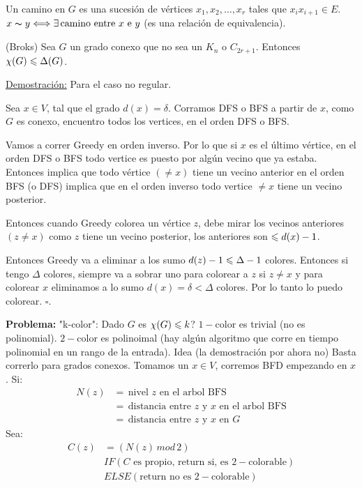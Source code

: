\documentclass[12pt,a4paper]{article}
\begin{document}
\begin{definition} Un camino en $G$ es una sucesión de vértices $x_{1},x_{2},\ldots,x_{r}$
    tales que $x_{i}x_{i+1} \in E$. $x \thicksim y \Longleftrightarrow \exists \,\text{camino entre $x$ e $y$}$
    (es una relación de equivalencia).
\end{definition}

\begin{teorema} (Broks) Sea $G$ un grado conexo que no sea un $K_{n}$ o $C_{2r+1}$. 
    Entonces $\chi(G) \leqslant \Delta(G)$.
\end{teorema}

\underline{Demostración:} Para el caso no regular.
\medskip

Sea $x \in V$, tal que el grado $d(x) = \delta$. Corramos DFS o BFS a partir 
de $x$, como $G$ es conexo, encuentro todos los vertices, en el orden DFS o BFS.
\medskip

Vamos a correr Greedy en orden inverso. Por lo que si $x$ es el último vértice, 
en el orden DFS o BFS todo vertice es puesto por algún vecino que ya estaba. 
Entonces implica que todo vértice $(\neq x)$ tiene un vecino anterior en el orden 
BFS (o DFS) implica que en el orden inverso todo vertice $\neq x$ tiene un vecino 
posterior.
\medskip

Entonces cuando Greedy colorea un vértice $z$, debe mirar los vecinos anteriores 
$(z \neq x)$ como $z$ tiene un vecino posterior, los anteriores son $\leqslant d(x) -1$.
\medskip

Entonces Greedy va a eliminar a los sumo $d(z) -1 \leqslant \Delta -1$ colores. Entonces 
si tengo $\Delta$ colores, siempre va a sobrar uno para colorear a $z$ si $z \neq x$ 
y para colorear $x$ eliminamos a lo sumo $d(x) = \delta < \Delta$ colores. Por lo 
tanto lo puedo colorear. $\square$.
\medskip

\textbf{Problema:} "k-color": Dado $G$ es $\chi(G) \leqslant k$? $1-$color es trivial 
(no es polinomial). $2-$color es polinoimal (hay algún algoritmo que corre en tiempo 
polinomial en un rango de la entrada). Idea (la demostración por ahora no) Basta 
correrlo para grados conexos. Tomamos un $x\in V$, corremos BFD empezando en $x$. Si:
\begin{align*}
    N(z) &=\, \text{nivel $z$ en el arbol BFS}\\
         &=\, \text{distancia entre $z$ y $x$ en el arbol BFS}\\
         &=\, \text{distancia entre $z$ y $x$ en $G$}
\end{align*}
Sea: 
\begin{align*}
    C(z) &= (N(z)\, mod\, 2)\\
    &IF(\text{$C$ es propio, return si, es $2-$colorable})\\
    &ELSE(\text{return no es $2-$colorable})
\end{align*}
\end{document}

